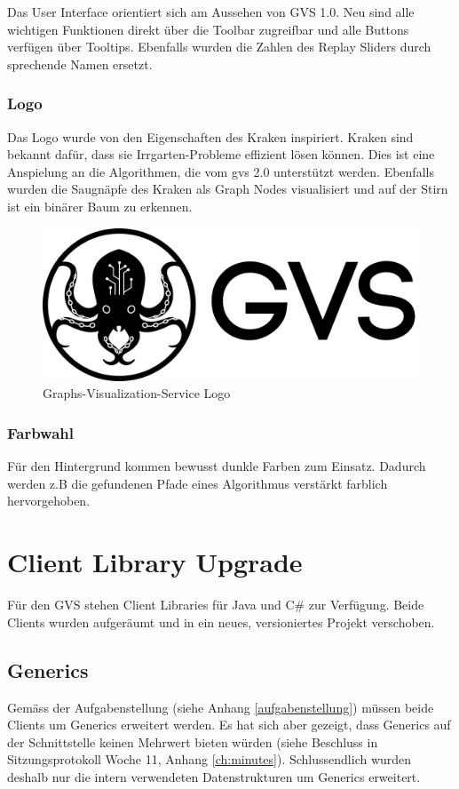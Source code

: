 \documentclass[11pt,a4paper,english,oneside]{book}
\numberwithin{equation}{chapter}
\begin{document}
	Das User Interface orientiert sich am Aussehen von GVS 1.0. Neu sind alle wichtigen Funktionen direkt über die Toolbar zugreifbar und alle Buttons verfügen über Tooltips. Ebenfalls wurden die Zahlen des Replay Sliders durch sprechende Namen ersetzt.
	
	\subsubsection{Logo}
	Das Logo wurde von den Eigenschaften des Kraken \cite{kraken} inspiriert. Kraken sind bekannt dafür, dass sie Irrgarten-Probleme effizient lösen können. Dies ist eine Anspielung an die Algorithmen, die vom \gls{gvs} 2.0 unterstützt werden. Ebenfalls wurden die Saugnäpfe des Kraken als Graph Nodes visualisiert und auf der Stirn ist ein binärer Baum zu erkennen. 
	
	\begin{figure}[h!]
		\centering
		\includegraphics[width=0.5\linewidth]{assets/images/logo}
		\caption[GVS Logo]{Graphs-Visualization-Service Logo}
		\label{fig:logo}
	\end{figure}
	
	\subsubsection{Farbwahl}
	Für den Hintergrund kommen bewusst dunkle Farben zum Einsatz. Dadurch werden z.B die gefundenen Pfade eines Algorithmus verstärkt farblich hervorgehoben. 
	
	
		
	\section{Client Library Upgrade}
	Für den GVS stehen Client Libraries für Java und C\# zur Verfügung. Beide Clients wurden aufgeräumt und in ein neues, versioniertes Projekt verschoben.
	
	\subsection{Generics}
	Gemäss der Aufgabenstellung (siehe Anhang \ref{aufgabenstellung}) müssen beide Clients um Generics erweitert werden. Es hat sich aber gezeigt, dass Generics auf der Schnittstelle keinen Mehrwert bieten würden (siehe Beschluss in Sitzungsprotokoll Woche 11, Anhang \ref{ch:minutes}). Schlussendlich wurden deshalb nur die intern verwendeten Datenstrukturen um Generics erweitert.
	
\end{document}
